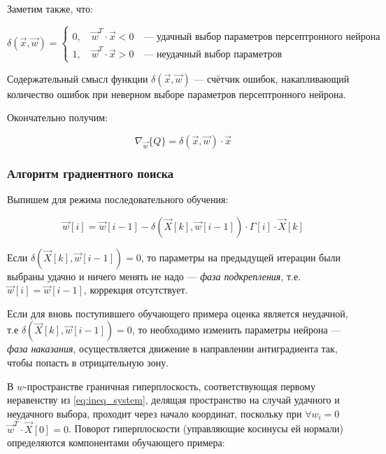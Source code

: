\documentclass{article}
\numberwithin{equation}{subsection}
\begin{document}
Заметим также, что:

\begin{equation}
    \delta (\vec{x}, \vec{w}) =
    \begin{cases}
        0, \quad \vec{w}^T \cdot \vec{x} < 0 \quad \textrm{--- удачный выбор параметров персептронного нейрона}\\
        1, \quad \vec{w}^T \cdot \vec{x} > 0 \quad \textrm{--- неудачный выбор параметров}
    \end{cases}
\end{equation}

Содержательный смысл функции $\delta (\vec{x}, \vec{w})$ --- счётчик ошибок,
накапливающий количество ошибок при неверном выборе параметров персептронного нейрона.

Окончательно получим:

\begin{equation}
    \nabla_{\vec{w}} \{Q\} = \delta (\vec{x}, \vec{w}) \cdot \vec{x}
\end{equation}



\subsubsection{Алгоритм градиентного поиска}

Выпишем для режима последовательного обучения:

\begin{equation}
    \vec{w}[i] = \vec{w}[i-1] - \delta (\vec{X}[k], \vec{w}[i-1]) \cdot \Gamma[i] \cdot \vec{X}[k]
\end{equation}

Если $\delta (\vec{X}[k], \vec{w}[i-1]) = 0$, то параметры на предыдущей итерации были
выбраны удачно и ничего менять не надо --- \textit{фаза подкрепления}, т.е.
$\vec{w}[i] = \vec{w}[i-1]$, коррекция отсутствует.

Если для вновь поступившего обучающего примера оценка является неудачной, т.е
$\delta (\vec{X}[k], \vec{w}[i-1]) = 0$, то необходимо изменить параметры нейрона ---
\textit{фаза наказания}, осуществляется движение в направлении антиградиента так, чтобы
попасть в отрицательную зону.

В $w$-пространстве граничная гиперплоскость, соответствующая первому неравенству 
из \ref{eq:ineq_system}, делящая пространство на случай удачного и неудачного выбора,
проходит через начало координат, поскольку при $\forall w_i = 0$ 
$\vec{w}^T \cdot \vec{X}[0] = 0$. Поворот гиперплоскости (управляющие косинусы ей нормали)
определяются компонентами обучающего примера: 
\end{document}
